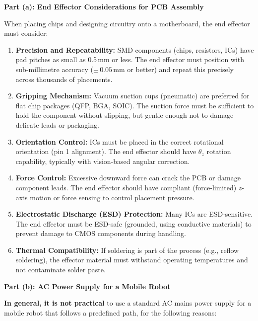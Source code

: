 \documentclass[12pt,a3paper]{article}
\begin{document}
\begin{enumerate}
\begin{tcolorbox}[enhanced,breakable,ansbox,colback=cC!4,colframe=cC,
  boxrule=0.8pt,arc=5pt,
  title={\textbf{Answer}},fonttitle=\bfseries\color{white},colbacktitle=cC]
\textbf{Part (a): End Effector Considerations for PCB Assembly}

\medskip
When placing chips and designing circuitry onto a motherboard, the end
effector must consider:

\begin{enumerate}[label=\textbf{\arabic*.}]
  \item \textbf{Precision and Repeatability:} SMD components (chips,
    resistors, ICs) have pad pitches as small as 0.5\,mm or less. The
    end effector must position with sub-millimetre accuracy
    ($\pm\,0.05$\,mm or better) and repeat this precisely across
    thousands of placements.

  \item \textbf{Gripping Mechanism:} Vacuum suction cups (pneumatic) are
    preferred for flat chip packages (QFP, BGA, SOIC). The suction force
    must be sufficient to hold the component without slipping, but gentle
    enough not to damage delicate leads or packaging.

  \item \textbf{Orientation Control:} ICs must be placed in the correct
    rotational orientation (pin 1 alignment). The end effector should
    have $\theta_z$ rotation capability, typically with vision-based
    angular correction.

  \item \textbf{Force Control:} Excessive downward force can crack the
    PCB or damage component leads. The end effector should have
    compliant (force-limited) $z$-axis motion or force sensing to
    control placement pressure.

  \item \textbf{Electrostatic Discharge (ESD) Protection:} Many ICs are
    ESD-sensitive. The end effector must be ESD-safe (grounded, using
    conductive materials) to prevent damage to CMOS components during
    handling.

  \item \textbf{Thermal Compatibility:} If soldering is part of the
    process (e.g., reflow soldering), the effector material must
    withstand operating temperatures and not contaminate solder paste.
\end{enumerate}

\medskip
\textbf{Part (b): AC Power Supply for a Mobile Robot}

\medskip
\textbf{In general, it is not practical} to use a standard AC mains
power supply for a mobile robot that follows a predefined path, for the
following reasons:


\end{tcolorbox}
\end{enumerate}
\end{document}
